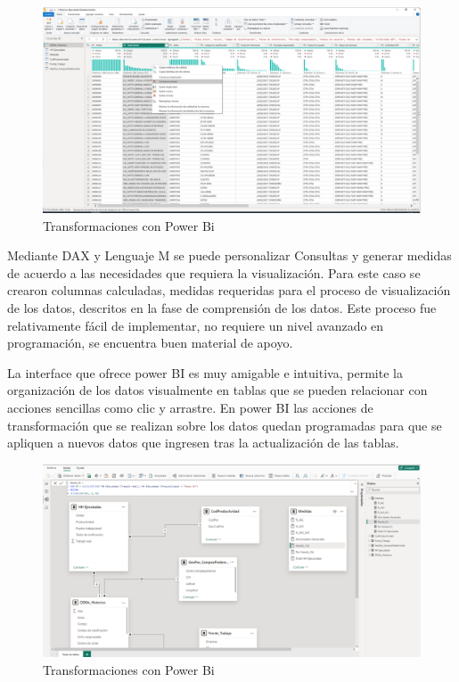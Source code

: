 \documentclass[
  11pt,
  bookmarksnumbered]{article}
\begin{document}
\begin{figure}

{\centering \includegraphics[width=5.78in]{media 2/image9} 

}

\caption{Transformaciones con Power Bi}\label{fig:unnamed-chunk-14}
\end{figure}

Mediante DAX y Lenguaje M se puede personalizar Consultas y generar medidas de acuerdo a las necesidades que requiera la visualización.
Para este caso se crearon columnas calculadas, medidas requeridas para el proceso de visualización de los datos, descritos en la fase de comprensión de los datos.
Este proceso fue relativamente fácil de implementar, no requiere un nivel avanzado en programación, se encuentra buen material de apoyo.

La interface que ofrece power BI es muy amigable e intuitiva, permite la organización de los datos visualmente en tablas que se pueden relacionar con acciones sencillas como clic y arrastre.
En power BI las acciones de transformación que se realizan sobre los datos quedan programadas para que se apliquen a nuevos datos que ingresen tras la actualización de las tablas.

\begin{figure}

{\centering \includegraphics[width=4.8in]{media 2/image10} 

}

\caption{Transformaciones con Power Bi}\label{fig:unnamed-chunk-15}
\end{figure}
\end{document}
